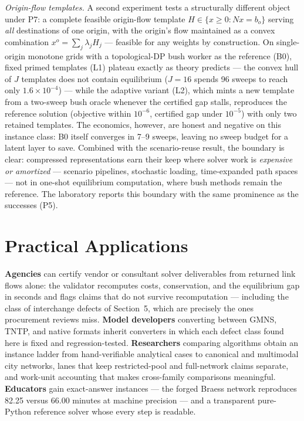\documentclass[11pt]{article}
\begin{document}
\emph{Origin-flow templates.} A second experiment tests a structurally
different object under P7: a complete feasible origin-flow template
$H\in\{x\ge0:Nx=b_o\}$ serving \emph{all} destinations of one origin, with
the origin's flow maintained as a convex combination
$x^o=\sum_j\lambda_j H_j$ --- feasible for any weights by construction.
On single-origin monotone grids with a topological-DP bush worker as the
reference (B0), fixed primed templates (L1) plateau exactly as theory
predicts --- the convex hull of $J$ templates does not contain equilibrium
($J{=}16$ spends 96 sweeps to reach only $1.6\times10^{-4}$) --- while the
adaptive variant (L2), which mints a new template from a two-sweep bush
oracle whenever the certified gap stalls, reproduces the reference solution
(objective within $10^{-6}$, certified gap under $10^{-5}$) with only two
retained templates. The economics, however, are honest and negative on
this instance class: B0 itself converges in 7--9 sweeps, leaving no sweep
budget for a latent layer to save. Combined with the scenario-reuse result,
the boundary is clear: compressed representations earn their keep where
solver work is \emph{expensive or amortized} --- scenario pipelines,
stochastic loading, time-expanded path spaces --- not in one-shot
equilibrium computation, where bush methods remain the reference. The
laboratory reports this boundary with the same prominence as the
successes (P5).

\section{Practical Applications}

\textbf{Agencies} can certify vendor or consultant solver deliverables
from returned link flows alone: the validator recomputes costs,
conservation, and the equilibrium gap in seconds and flags claims that do
not survive recomputation --- including the class of interchange defects of
Section~5, which are precisely the ones procurement reviews miss.
\textbf{Model developers} converting between GMNS, TNTP, and native
formats inherit converters in which each defect class found here is fixed
and regression-tested. \textbf{Researchers} comparing algorithms obtain an
instance ladder from hand-verifiable analytical cases to canonical and
multimodal city networks, lanes that keep restricted-pool and full-network
claims separate, and work-unit accounting that makes cross-family
comparisons meaningful. \textbf{Educators} gain exact-answer instances ---
the forged Braess network reproduces 82.25 versus 66.00 minutes at
machine precision --- and a transparent pure-Python reference solver whose
every step is readable.
\end{document}
